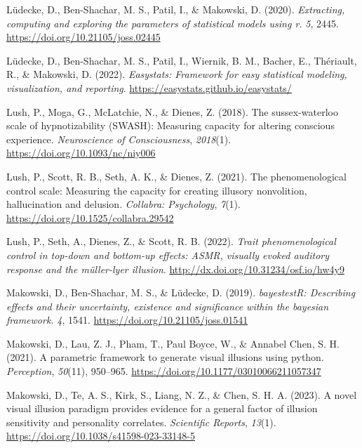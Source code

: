 \documentclass[
  man,
  floatsintext,
  longtable,
  nolmodern,
  notxfonts,
  notimes,
  colorlinks=true,linkcolor=blue,citecolor=blue,urlcolor=blue]{apa7}
\newlength{\cslhangindent}
\newenvironment{CSLReferences}[2] %
 {\begin{list}{}{%
  \setlength{\itemindent}{0pt}
  \setlength{\leftmargin}{0pt}
  \setlength{\parsep}{0pt}
  \ifodd #1
   \setlength{\leftmargin}{\cslhangindent}
   \setlength{\itemindent}{-1\cslhangindent}
  \fi
  \setlength{\itemsep}{#2\baselineskip}}}
 {\end{list}}
\begin{document}
\begin{CSLReferences}{1}{0}
Lüdecke, D., Ben-Shachar, M. S., Patil, I., \& Makowski, D. (2020).
\emph{Extracting, computing and exploring the parameters of statistical
models using {\textbraceleft}r{\textbraceright}.} \emph{5}, 2445.
\url{https://doi.org/10.21105/joss.02445}

Lüdecke, D., Ben-Shachar, M. S., Patil, I., Wiernik, B. M., Bacher, E.,
Thériault, R., \& Makowski, D. (2022). \emph{Easystats: Framework for
easy statistical modeling, visualization, and reporting}.
\url{https://easystats.github.io/easystats/}

Lush, P., Moga, G., McLatchie, N., \& Dienes, Z. (2018). The
sussex-waterloo scale of hypnotizability (SWASH): Measuring capacity for
altering conscious experience. \emph{Neuroscience of Consciousness},
\emph{2018}(1). \url{https://doi.org/10.1093/nc/niy006}

Lush, P., Scott, R. B., Seth, A. K., \& Dienes, Z. (2021). The
phenomenological control scale: Measuring the capacity for creating
illusory nonvolition, hallucination and delusion. \emph{Collabra:
Psychology}, \emph{7}(1). \url{https://doi.org/10.1525/collabra.29542}

Lush, P., Seth, A., Dienes, Z., \& Scott, R. B. (2022). \emph{Trait
phenomenological control in top-down and bottom-up effects: ASMR,
visually evoked auditory response and the müller-lyer illusion}.
\url{http://dx.doi.org/10.31234/osf.io/hw4y9}

Makowski, D., Ben-Shachar, M. S., \& Lüdecke, D. (2019).
\emph{bayestestR: Describing effects and their uncertainty, existence
and significance within the bayesian framework.} \emph{4}, 1541.
\url{https://doi.org/10.21105/joss.01541}

Makowski, D., Lau, Z. J., Pham, T., Paul Boyce, W., \& Annabel Chen, S.
H. (2021). A parametric framework to generate visual illusions using
python. \emph{Perception}, \emph{50}(11), 950--965.
\url{https://doi.org/10.1177/03010066211057347}

Makowski, D., Te, A. S., Kirk, S., Liang, N. Z., \& Chen, S. H. A.
(2023). A novel visual illusion paradigm provides evidence for a general
factor of illusion sensitivity and personality correlates.
\emph{Scientific Reports}, \emph{13}(1).
\url{https://doi.org/10.1038/s41598-023-33148-5}


\end{CSLReferences}
\end{document}
